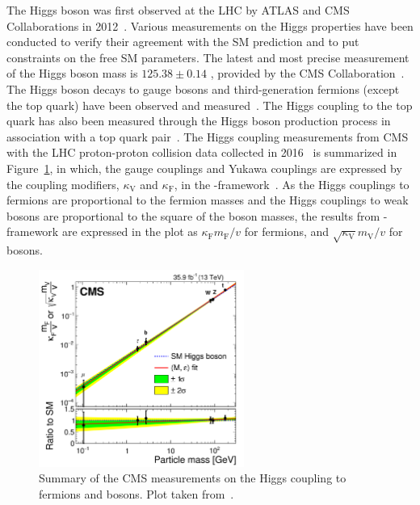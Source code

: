 The Higgs boson was first observed at the LHC by ATLAS and CMS Collaborations in 2012~\cite{Aad:2012tfa, Chatrchyan:2012xdj, Chatrchyan:2013lba}.
Various measurements on the Higgs properties have been conducted to verify their agreement with the SM prediction and to put constraints on the free SM parameters.
The latest and most precise measurement of the Higgs boson mass is $125.38 \pm 0.14$ \GeV, provided by the CMS Collaboration~\cite{2020135425}. 
The Higgs boson decays to gauge bosons and third-generation fermions (except the top quark) have been observed 
and measured~\cite{Sirunyan:2312121, 201996, Sirunyan:2017exp, PhysRevLett.121.121801, 2018283, PhysRevD.99.072001, 201859, 2019508, Aaboud_2018}.
The Higgs coupling to the top quark has also been measured through the Higgs boson production process in association with a top quark pair~\cite{PhysRevLett.120.231801, 2018173}.
The Higgs coupling measurements from CMS with the LHC proton-proton collision data collected in 2016~\cite{Sirunyan:2640611} is summarized in Figure~\ref{fig:higgs_2016},
in which, the gauge couplings and Yukawa couplings are expressed by the coupling modifiers,
$\kappa_{\text{V}}$ and $\kappa_{\text{F}}$, in the \kappa-framework~\cite{Heinemeyer:2013tqa}.
As the Higgs couplings to fermions are proportional to the fermion masses and the Higgs couplings to weak bosons are proportional to the square of the boson masses,
the results from \kappa-framework are expressed in the plot as $\kappa_{\text{F}}m_{\text{F}}/v$ for fermions, and $\sqrt{\kappa_{\text{V}}}m_{\text{V}}/v$ for bosons.

\begin{figure}[!htb]
  \centering
  \includegraphics[width=0.60\textwidth]{pics/Intro/higgs_coupling_2016.png}
  \caption{Summary of the CMS measurements on the Higgs coupling to fermions and bosons.
           Plot taken from~\cite{Sirunyan:2640611}. }
  \label{fig:higgs_2016}
\end{figure}

